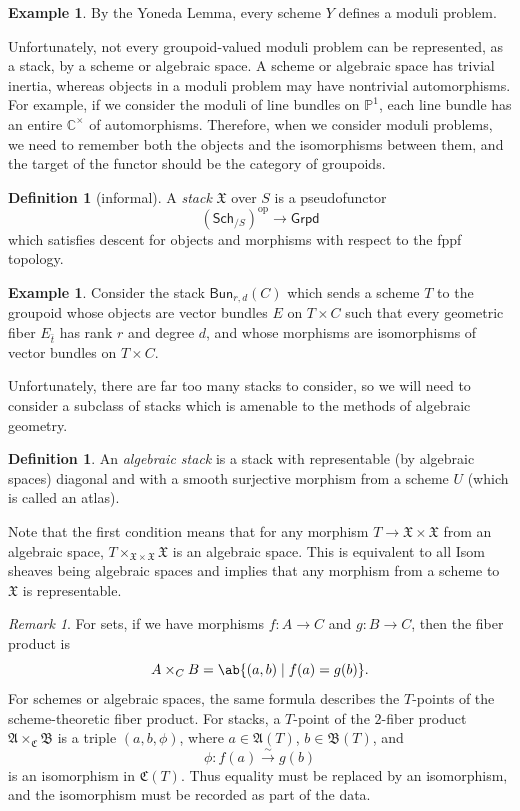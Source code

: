 \documentclass{amsart}
\theoremstyle{definition}
\newtheorem{defn}[thm]{Definition}
\newtheorem{exm}[thm]{Example}
\theoremstyle{remark}
\newtheorem{rmk}[thm]{Remark}
\theoremstyle{plain}
\theoremstyle{definition}
\theoremstyle{remark}
\newcommand{\C}{\mathbb{C}}
\renewcommand{\P}{\mathbb{P}}
\newcommand{\mf}[1]{\mathfrak{#1}}
\newcommand{\mr}[1]{\mathrm{#1}}
\newcommand{\ms}[1]{\mathsf{#1}}
\newcommand{\1}{\mathbf{1}}
\newcommand{\2}{\mathbf{2}}
\newcommand{\3}{\mathbf{3}}
\begin{document}
\begin{exm}
    By the Yoneda Lemma, every scheme \(Y\) defines a moduli problem.
\end{exm}

Unfortunately, not every groupoid-valued moduli problem can be represented, as a stack, by a scheme or algebraic space. A scheme or algebraic space has trivial inertia, whereas objects in a moduli problem may have nontrivial automorphisms. For example, if we consider the moduli of line bundles on \(\P^1\), each line bundle has an entire \(\C^{\times}\) of automorphisms. Therefore, when we consider moduli problems, we need to remember both the objects and the isomorphisms between them, and the target of the functor should be the category of groupoids.

\begin{defn}[informal]
    A \textit{stack} \(\mf{X}\) over \(S\) is a pseudofunctor
    \[ (\ms{Sch}_{/S})^{\mr{op}} \to \ms{Grpd} \]
    which satisfies descent for objects and morphisms with respect to the fppf topology.
\end{defn}

\begin{exm}
    Consider the stack \(\ms{Bun}_{r,d}(C)\) which sends a scheme \(T\) to the groupoid whose objects are vector bundles \(E\) on \(T\times C\) such that every geometric fiber \(E_{\bar t}\) has rank \(r\) and degree \(d\), and whose morphisms are isomorphisms of vector bundles on \(T\times C\).
\end{exm}

Unfortunately, there are far too many stacks to consider, so we will need to consider a subclass of stacks which is amenable to the methods of algebraic geometry.

\begin{defn}
    An \textit{algebraic stack} is a stack with representable (by algebraic spaces) diagonal and with a smooth surjective morphism from a scheme \(U\) (which is called an atlas). 
\end{defn}

Note that the first condition means that for any morphism \(T \to \mf{X} \times \mf{X}\) from an algebraic space, \(T \times_{\mf{X} \times \mf{X}} \mf{X}\) is an algebraic space. This is equivalent to all Isom sheaves being algebraic spaces and implies that any morphism from a scheme to \(\mf{X}\) is representable.

\begin{rmk}
    For sets, if we have morphisms \(f\colon A\to C\) and \(g\colon B\to C\), then the fiber product is
    \[ 
        A\times_C B=\ab\{(a,b)\mid f(a)=g(b)\}. 
    \] 
    For schemes or algebraic spaces, the same formula describes the \(T\)-points of the scheme-theoretic fiber product. For stacks, a \(T\)-point of the \(2\)-fiber product \(\mf{A}\times_{\mf{C}}\mf{B}\) is a triple \((a,b,\phi)\), where \(a\in\mf{A}(T)\), \(b\in\mf{B}(T)\), and
    \[ 
        \phi\colon f(a)\xrightarrow{\sim}g(b) 
    \]
    is an isomorphism in \(\mf{C}(T)\). Thus equality must be replaced by an isomorphism, and the isomorphism must be recorded as part of the data.
\end{rmk}
\end{document}

